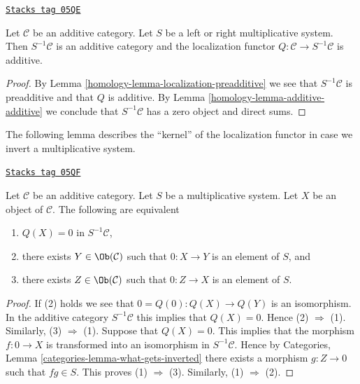 \begin{lemma}
\label{homology-lemma-localization-additive}
\href{https://stacks.math.columbia.edu/tag/05QE}{\texttt{Stacks tag 05QE}}

Let $\mathcal{C}$ be an additive category.
Let $S$ be a left or right multiplicative system.
Then $S^{-1}\mathcal{C}$ is an additive category and the localization functor
$Q : \mathcal{C} \to S^{-1}\mathcal{C}$ is additive.
\end{lemma}

\begin{proof}

By Lemma \ref{homology-lemma-localization-preadditive}
we see that $S^{-1}\mathcal{C}$ is preadditive and that $Q$ is additive.
By Lemma \ref{homology-lemma-additive-additive} we conclude that $S^{-1}\mathcal{C}$
has a zero object and direct sums.
\end{proof}

The following lemma describes the ``kernel''
of the localization functor in case we invert a multiplicative system.

\begin{lemma}
\label{homology-lemma-kernel-localization}
\href{https://stacks.math.columbia.edu/tag/05QF}{\texttt{Stacks tag 05QF}}

Let $\mathcal{C}$ be an additive category. Let $S$ be a multiplicative
system. Let $X$ be an object
of $\mathcal{C}$. The following are equivalent
\begin{enumerate}
\item $Q(X) = 0$ in $S^{-1}\mathcal{C}$,
\item there exists $Y \in \Ob(\mathcal{C})$ such that
$0 : X \to Y$ is an element of $S$, and
\item there exists $Z \in \Ob(\mathcal{C})$ such that
$0 : Z \to X$ is an element of $S$.
\end{enumerate}
\end{lemma}

\begin{proof}
If (2) holds we see that $0 = Q(0) : Q(X) \to Q(Y)$ is an isomorphism.
In the additive category $S^{-1}\mathcal{C}$ this implies that $Q(X) = 0$.
Hence (2) $\Rightarrow$ (1). Similarly, (3) $\Rightarrow$ (1).
Suppose that $Q(X) = 0$. This implies that the morphism
$f : 0 \to X$ is transformed into an isomorphism in $S^{-1}\mathcal{C}$.
Hence by
Categories, Lemma \ref{categories-lemma-what-gets-inverted}
there exists a morphism $g : Z \to 0$ such that $fg \in S$. This proves
(1) $\Rightarrow$ (3). Similarly, (1) $\Rightarrow$ (2).
\end{proof}

